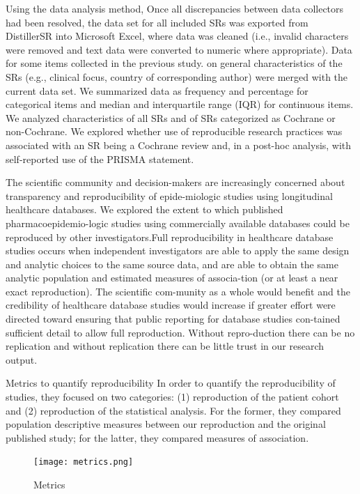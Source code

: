 \documentclass[
10pt, %
a4paper, %
oneside, %
headinclude,footinclude, %
BCOR5mm, %
]{scrartcl}
\begin{document}
Using the data analysis method, Once all discrepancies between data collectors had been resolved, the data set for all included SRs was exported from DistillerSR into Microsoft Excel, where data was cleaned (i.e., invalid characters were removed and text data were converted to numeric where appropriate). Data for some items collected in the previous study. on general characteristics of the SRs (e.g., clinical focus, country of corresponding author) were merged with the current data set. We summarized data as frequency and percentage for categorical items and median and interquartile range (IQR) for continuous items. We analyzed characteristics of all SRs and of SRs categorized as Cochrane or non-Cochrane. We explored whether use of reproducible research practices was associated with an SR being a Cochrane review and, in a post-hoc analysis, with self-reported use of the PRISMA statement.

The scientific community and decision-makers are increasingly concerned about transparency and reproducibility of epide-miologic studies using longitudinal healthcare databases. We explored the extent to which published pharmacoepidemio-logic studies using commercially available databases could be reproduced by other investigators.Full reproducibility in healthcare database studies occurs when independent investigators are able to apply the same design and analytic choices to the same source data, and are able to obtain the same analytic population and estimated measures of associa-tion (or at least a near exact reproduction). The scientific com-munity as a whole would benefit and the credibility of healthcare database studies would increase if greater effort were directed toward ensuring that public reporting for database studies con-tained sufficient detail to allow full reproduction. Without repro-duction there can be no replication and without replication there can be little trust in our research output.

Metrics to quantify reproducibility
In order to quantify the reproducibility of studies, they focused on two categories: (1) reproduction of the patient cohort and (2) reproduction of the statistical analysis. For the former, they compared population descriptive measures between our reproduction and the original published study; for the latter, they compared measures of association. 
\begin{figure}[h]
    \centering
    \texttt{[image: metrics.png]}
    \caption{Metrics }
    \label{fig:metric}
\end{figure}
\end{document}
